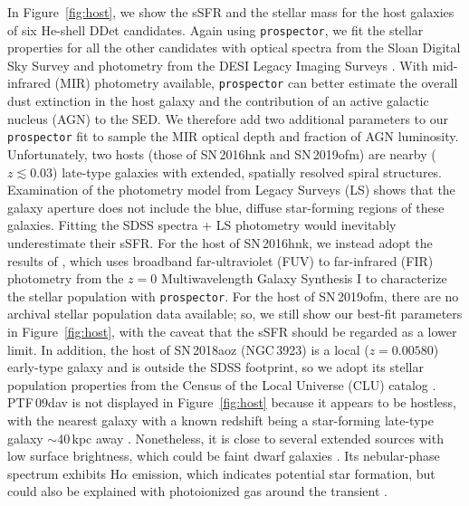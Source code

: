 \documentclass[twocolumn]{aastex631}
\begin{document}
In Figure~\ref{fig:host}, we show the sSFR and the stellar mass for the host galaxies of six He-shell DDet candidates. Again using \texttt{prospector}, we fit the stellar properties for all the other candidates with optical spectra from the Sloan Digital Sky Survey \citep[SDSS;][]{York_2000} and photometry from the DESI Legacy Imaging Surveys \citep[][$g$, $r$, $z$, $W_1$, $W_2$, $W_3$, $W_4$ magnitudes]{Dey_2019}. With mid-infrared (MIR) photometry available, \texttt{prospector} can better estimate the overall dust extinction in the host galaxy and the contribution of an active galactic nucleus (AGN) to the SED. We therefore add two additional parameters to our \texttt{prospector} fit to sample the MIR optical depth and fraction of AGN luminosity. Unfortunately, two hosts (those of SN\,2016hnk and SN\,2019ofm) are nearby ($z \lesssim 0.03$) late-type galaxies with extended, spatially resolved spiral structures. Examination of the photometry model from Legacy Surveys (LS) shows that the galaxy aperture does not include the blue, diffuse star-forming regions of these galaxies. Fitting the SDSS spectra + LS photometry would inevitably underestimate their sSFR. For the host of SN\,2016hnk, we instead adopt the results of \citet{Dong_Ca-rich_2022}, which uses broadband far-ultraviolet (FUV) to far-infrared (FIR) photometry from the $z=0$ Multiwavelength Galaxy Synthesis I \citep[z0MGS;][]{Leroy_2019} to characterize the stellar population with \texttt{prospector}. For the host of SN\,2019ofm, there are no archival stellar population data available; so, we still show our best-fit parameters in Figure~\ref{fig:host}, with the caveat that the sSFR should be regarded as a lower limit. In addition, the host of SN\,2018aoz (NGC\,3923) is a local ($z=0.00580$) early-type galaxy and is outside the SDSS footprint, so we adopt its stellar population properties from the Census of the Local Universe (CLU) catalog \citep{Cook_2019, de_Ca_rich_2020}. PTF\,09dav is not displayed in Figure~\ref{fig:host} because it appears to be hostless, with the nearest galaxy with a known redshift being a star-forming late-type galaxy $\sim$40\,kpc away \citep{Sullivan_2011}. Nonetheless, it is close to several extended sources with low surface brightness, which could be faint dwarf galaxies \citep[see Figure 3 in][]{Kasliwal_2012}. Its nebular-phase spectrum exhibits H$\alpha$ emission, which indicates potential star formation, but could also be explained with photoionized gas around the transient \citep{Kasliwal_2012}.
\end{document}
